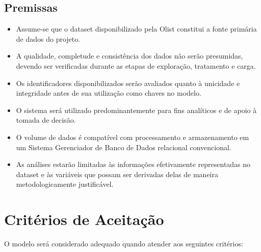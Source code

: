 \documentclass[12pt,a4paper]{article}
\begin{document}
\subsection{Premissas}

\begin{itemize}
    \item Assume-se que o dataset disponibilizado pela Olist constitui a fonte primária de dados do projeto.

    \item A qualidade, completude e consistência dos dados não serão presumidas, devendo ser verificadas durante as etapas de exploração, tratamento e carga.

    \item Os identificadores disponibilizados serão avaliados quanto à unicidade e integridade antes de sua utilização como chaves no modelo.

    \item O sistema será utilizado predominantemente para fins analíticos e de apoio à tomada de decisão.

    \item O volume de dados é compatível com processamento e armazenamento em um Sistema Gerenciador de Banco de Dados relacional convencional.

    \item As análises estarão limitadas às informações efetivamente representadas no dataset e às variáveis que possam ser derivadas delas de maneira metodologicamente justificável.
\end{itemize}

\section{Critérios de Aceitação}

O modelo será considerado adequado quando atender aos seguintes critérios:
\end{document}

